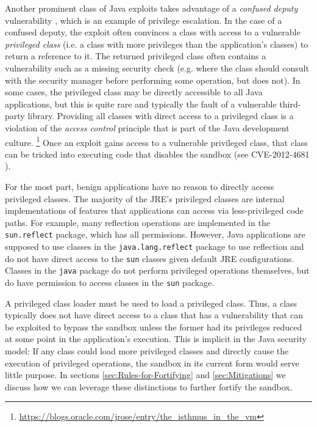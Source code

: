 \documentclass{sig-alternate}
\begin{document}
Another prominent class of Java exploits takes advantage of a \textit{confused
deputy} vulnerability \cite{hardy_confused_1988}, which is an example
of privilege escalation. In the case of a confused deputy, the exploit
often convinces a class with access to a vulnerable \textit{privileged
class} (i.e. a class with more privileges than the application's classes)
to return a reference to it. The returned privileged class often contains
a vulnerability such as a missing security check (e.g. where the class
should consult with the security manager before performing some operation,
but does not). In some cases, the privileged class may be directly
accessible to all Java applications, but this is quite rare and typically
the fault of a vulnerable third-party library. Providing all classes
with direct access to a privileged class is a violation of the \textit{access
control} principle that is part of the Java development culture.%
\footnote{\url{https://blogs.oracle.com/jrose/entry/the_isthmus_in_the_vm}%
} Once an exploit gains access to a vulnerable privileged class, that
class can be tricked into executing code that disables the sandbox
(see CVE-2012-4681 \cite{_vulnerability_2012_4681}).

For the most part, benign applications have no reason to directly
access privileged classes. The majority of the JRE's privileged classes
are internal implementations of features that applications can access
via less-privileged code paths. For example, many reflection operations
are implemented in the \texttt{sun.reflect} package, which has all
permissions. However, Java applications are supposed to use classes
in the \texttt{java.lang.reflect} package to use reflection and do
not have direct access to the \texttt{sun} classes given default JRE
configurations. Classes in the \texttt{java} package do not perform
privileged operations themselves, but do have permission to access
classes in the \texttt{sun} package.

A privileged class loader must be used to load a privileged class.
Thus, a class typically does not have direct access to a class that
has a vulnerability that can be exploited to bypass the sandbox unless
the former had its privileges reduced at some point in the application's
execution. This is implicit in the Java security model: If any class
could load more privileged classes and directly cause the execution
of privileged operations, the sandbox in its current form would serve
little purpose. In sections \ref{sec:Rules-for-Fortifying} and \ref{sec:Mitigations}
we discuss how we can leverage these distinctions to further fortify
the sandbox.
\end{document}
